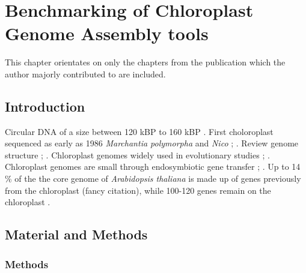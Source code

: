 
\chapter{Benchmarking of Chloroplast Genome Assembly tools } %

\label{Chapter1} %
This chapter orientates on \cite{freudenthal2019landscape} only the chapters from the publication which the author majorly contributed to are included. 


\newcommand{\keyword}[1]{\textbf{#1}}
\newcommand{\tabhead}[1]{\textbf{#1}}
\newcommand{\code}[1]{\texttt{#1}}
\newcommand{\file}[1]{\texttt{\bfseries#1}}
\newcommand{\option}[1]{\texttt{\itshape#1}}


\section{Introduction}

Circular DNA of a size between 120 kBP to 160 kBP \cite{palmer_1985}.  First choloroplast sequenced as early
as 1986 \textit{Marchantia polymorpha} and \textit{Nico} \cite{ohyama_chloroplast_1986}; \cite{shinozaki_complete_1986}.
Review  genome structure \cite{green_chloroplast_2011}; \cite{wicke_evolution_2011}.
Chloroplast genomes widely used in evolutionary studies \cite{martin_evolutionary_2002}; \cite{xiao-ming_inferring_2017}.
Chloroplast genomes are small through endosymbiotic gene transfer \cite{martin_evolutionary_2002}; \cite{deiner_environmental_2017}. Up to 14 \% of the the core genome of \textit{Arabidopsis thaliana} is made up of genes previously from the chloroplast (fancy citation), while 100-120 genes remain on the chloroplast \cite{wicke_evolution_2011}.


\section{Material and Methods}
\subsection{Methods}
